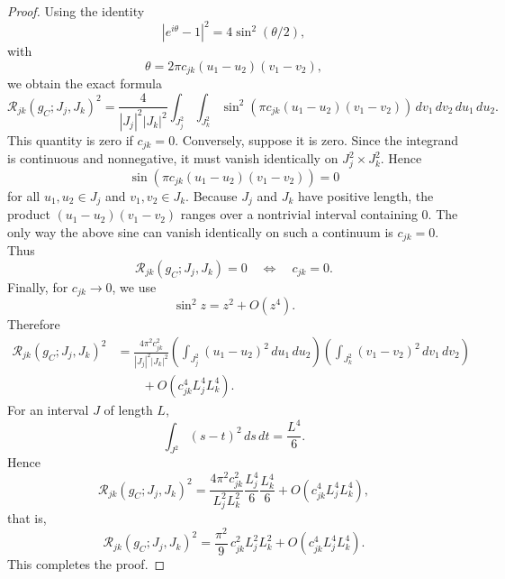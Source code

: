 \documentclass[10pt,a4paper]{amsart}
\begin{document}
\begin{proof}
{Using the identity
$$
|e^{i\theta}-1|^2=4\sin^2(\theta/2),
$$
with
$$
\theta=2\pi c_{jk}(u_1-u_2)(v_1-v_2),
$$
we obtain the exact formula
$$
\mathcal R_{jk}(g_C;J_j,J_k)^2
=
\frac{4}{|J_j|^2|J_k|^2}
\int_{J_j^2}\int_{J_k^2}
\sin^2\!\left(
\pi c_{jk}(u_1-u_2)(v_1-v_2)
\right)
\,dv_1\,dv_2\,du_1\,du_2.
$$
This quantity is zero if $c_{jk}=0$. Conversely, suppose it is zero. Since the integrand is
continuous and nonnegative, it must vanish identically on
$J_j^2\times J_k^2$. Hence
$$
\sin\!\left(
\pi c_{jk}(u_1-u_2)(v_1-v_2)
\right)=0
$$
for all $u_1,u_2\in J_j$ and $v_1,v_2\in J_k$. Because $J_j$ and $J_k$
have positive length, the product
$(u_1-u_2)(v_1-v_2)$ ranges over a nontrivial interval containing $0$.
The only way the above sine can vanish identically on such a continuum is $c_{jk}=0$.
Thus
$$
\mathcal R_{jk}(g_C;J_j,J_k)=0
\quad\Longleftrightarrow\quad
c_{jk}=0.
$$
Finally, for $c_{jk}\to0$, we use
$$
\sin^2 z=z^2+O(z^4).
$$
Therefore
$$
\begin{aligned}
\mathcal R_{jk}(g_C;J_j,J_k)^2
&=
\frac{4\pi^2c_{jk}^2}{|J_j|^2|J_k|^2}
\left(
\int_{J_j^2}(u_1-u_2)^2\,du_1\,du_2
\right)
\left(
\int_{J_k^2}(v_1-v_2)^2\,dv_1\,dv_2
\right)\\
&\qquad
+
O\!\left(c_{jk}^4 L_j^4L_k^4\right).
\end{aligned}
$$
For an interval $J$ of length $L$,
$$
\int_{J^2}(s-t)^2\,ds\,dt=\frac{L^4}{6}.
$$
Hence
$$
\mathcal R_{jk}(g_C;J_j,J_k)^2
=
\frac{4\pi^2c_{jk}^2}{L_j^2L_k^2}
\frac{L_j^4}{6}\frac{L_k^4}{6}
+
O\!\left(c_{jk}^4 L_j^4L_k^4\right),
$$
that is,
$$
\mathcal R_{jk}(g_C;J_j,J_k)^2
=
\frac{\pi^2}{9}\,c_{jk}^2L_j^2L_k^2
+
O\!\left(c_{jk}^4L_j^4L_k^4\right).
$$
This completes the proof.}
\end{proof}
\end{document}
